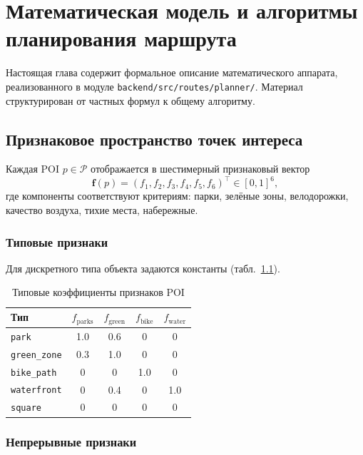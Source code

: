 \chapter{Математическая модель и алгоритмы планирования маршрута}
\label{ch:math}

Настоящая глава содержит формальное описание математического аппарата,
реализованного в модуле \texttt{backend/src/routes/planner/}. Материал
структурирован от частных формул к общему алгоритму.

\section{Признаковое пространство точек интереса}

Каждая POI $p \in \mathcal{P}$ отображается в шестимерный признаковый вектор
\begin{equation}
  \mathbf{f}(p) = (f_1, f_2, f_3, f_4, f_5, f_6)^\top \in [0, 1]^6,
  \label{eq:feature-vector}
\end{equation}
где компоненты соответствуют критериям: парки, зелёные зоны, велодорожки,
качество воздуха, тихие места, набережные.

\subsection{Типовые признаки}

Для дискретного типа объекта задаются константы (табл.~\ref{tab:type-features}).

\begin{table}[H]
\centering
\caption{Типовые коэффициенты признаков POI}
\label{tab:type-features}
\begin{tabular}{@{}lcccc@{}}
\toprule
\textbf{Тип} & $f_{\text{parks}}$ & $f_{\text{green}}$ & $f_{\text{bike}}$ & $f_{\text{water}} $ \\
\midrule
\texttt{park} & 1.0 & 0.6 & 0 & 0 \\
\texttt{green\_zone} & 0.3 & 1.0 & 0 & 0 \\
\texttt{bike\_path} & 0 & 0 & 1.0 & 0 \\
\texttt{waterfront} & 0 & 0.4 & 0 & 1.0 \\
\texttt{square} & 0 & 0 & 0 & 0 \\
\bottomrule
\end{tabular}
\end{table}

\subsection{Непрерывные признаки}


